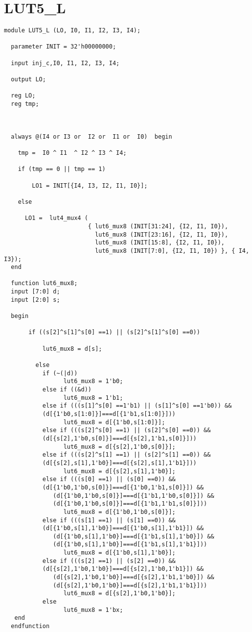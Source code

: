 \section{LUT5\_L}
\begin{lstlisting}
module LUT5_L (LO, I0, I1, I2, I3, I4);

  parameter INIT = 32'h00000000;

  input inj_c,I0, I1, I2, I3, I4;

  output LO;

  reg LO;
  reg tmp;
  
  

  always @(I4 or I3 or  I2 or  I1 or  I0)  begin
 
    tmp =  I0 ^ I1  ^ I2 ^ I3 ^ I4;

    if (tmp == 0 || tmp == 1)

        LO1 = INIT[{I4, I3, I2, I1, I0}];

    else 
    
      LO1 =  lut4_mux4 (
                        { lut6_mux8 (INIT[31:24], {I2, I1, I0}),
                          lut6_mux8 (INIT[23:16], {I2, I1, I0}),
                          lut6_mux8 (INIT[15:8], {I2, I1, I0}),
                          lut6_mux8 (INIT[7:0], {I2, I1, I0}) }, { I4, I3});
  end

  function lut6_mux8;
  input [7:0] d;
  input [2:0] s;
   
  begin

       if ((s[2]^s[1]^s[0] ==1) || (s[2]^s[1]^s[0] ==0))
           
           lut6_mux8 = d[s];

         else
           if (~(|d))
                 lut6_mux8 = 1'b0;
           else if ((&d))
                 lut6_mux8 = 1'b1;
           else if (((s[1]^s[0] ==1'b1) || (s[1]^s[0] ==1'b0)) &&
           (d[{1'b0,s[1:0]}]===d[{1'b1,s[1:0]}]))
                 lut6_mux8 = d[{1'b0,s[1:0]}];
           else if (((s[2]^s[0] ==1) || (s[2]^s[0] ==0)) &&
           (d[{s[2],1'b0,s[0]}]===d[{s[2],1'b1,s[0]}]))
                 lut6_mux8 = d[{s[2],1'b0,s[0]}];
           else if (((s[2]^s[1] ==1) || (s[2]^s[1] ==0)) && 
           (d[{s[2],s[1],1'b0}]===d[{s[2],s[1],1'b1}]))
                 lut6_mux8 = d[{s[2],s[1],1'b0}];
           else if (((s[0] ==1) || (s[0] ==0)) && 
           (d[{1'b0,1'b0,s[0]}]===d[{1'b0,1'b1,s[0]}]) &&
              (d[{1'b0,1'b0,s[0]}]===d[{1'b1,1'b0,s[0]}]) &&
              (d[{1'b0,1'b0,s[0]}]===d[{1'b1,1'b1,s[0]}]))
                 lut6_mux8 = d[{1'b0,1'b0,s[0]}];
           else if (((s[1] ==1) || (s[1] ==0)) && 
           (d[{1'b0,s[1],1'b0}]===d[{1'b0,s[1],1'b1}]) &&
              (d[{1'b0,s[1],1'b0}]===d[{1'b1,s[1],1'b0}]) && 
              (d[{1'b0,s[1],1'b0}]===d[{1'b1,s[1],1'b1}]))
                 lut6_mux8 = d[{1'b0,s[1],1'b0}];
           else if (((s[2] ==1) || (s[2] ==0)) && 
           (d[{s[2],1'b0,1'b0}]===d[{s[2],1'b0,1'b1}]) &&
              (d[{s[2],1'b0,1'b0}]===d[{s[2],1'b1,1'b0}]) &&
              (d[{s[2],1'b0,1'b0}]===d[{s[2],1'b1,1'b1}]))
                 lut6_mux8 = d[{s[2],1'b0,1'b0}];
           else
                 lut6_mux8 = 1'bx;
   end
  endfunction



\end{lstlisting}

